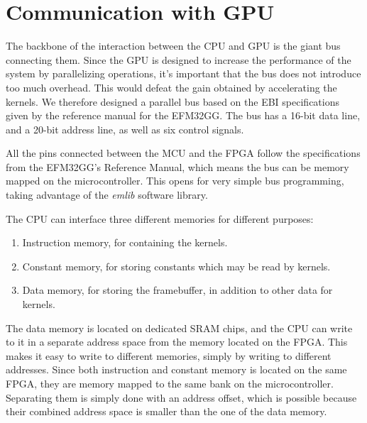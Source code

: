 \documentclass[../main/report.tex]{subfiles}
\begin{document}
\section{Communication with GPU}

The backbone of the interaction between the CPU and GPU is the giant bus connecting them.
Since the GPU is designed to increase the performance of the system by parallelizing operations,
it's important that the bus does not introduce too much overhead.
This would defeat the gain obtained by accelerating the kernels.
We therefore designed a parallel bus based on the EBI specifications given
by the reference manual for the EFM32GG\cite[p.175]{efm32gg}.
The bus has a 16-bit data line, and a 20-bit address line, as well as six control signals.

All the pins connected between the MCU and the FPGA follow the specifications from the EFM32GG's Reference Manual\cite[p.175]{efm32gg},
which means the bus can be memory mapped on the microcontroller.
This opens for very simple bus programming, taking advantage of the \textit{emlib} software library.

The CPU can interface three different memories for different purposes:

\begin{enumerate}
    \item Instruction memory, for containing the kernels.
    \item Constant memory, for storing constants which may be read by kernels.
    \item Data memory, for storing the framebuffer, in addition to other data for kernels.
\end{enumerate}

The data memory is located on dedicated SRAM chips,
and the CPU can write to it in a separate address space from the memory located on the FPGA.
This makes it easy to write to different memories, simply by writing to different addresses.
Since both instruction and constant memory is located on the same FPGA,
they are memory mapped to the same bank on the microcontroller.
Separating them is simply done with an address offset,
which is possible because their combined address space is smaller than the one of the data memory.
\end{document}
